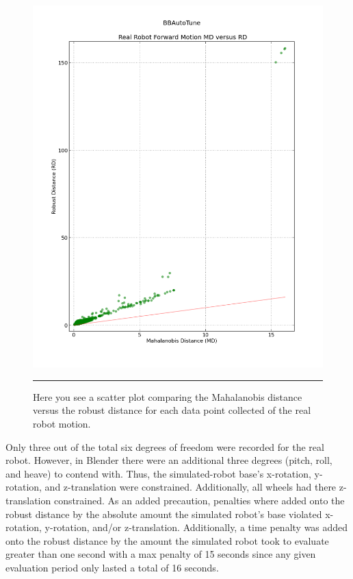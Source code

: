 \begin{figure}[htbp]
\centering
\includegraphics[scale=0.5]{../Figures/Chapter4/real_robot_md_vs_rd.png}
\rule{35em}{0.5pt}
\caption[Real Robot Forward Motion MD versus RD]{Here you see a scatter plot comparing the Mahalanobis distance versus the robust distance for each data point collected of the real robot motion.}
\label{fig:real_robot_md_vs_rd}
\end{figure}

Only three out of the total six degrees of freedom were recorded for the real robot. However, in Blender there were an additional three degrees (pitch, roll, and heave) to contend with.  Thus, the simulated-robot base's x-rotation, y-rotation, and z-translation were constrained. Additionally, all wheels had there z-translation constrained. As an added precaution, penalties where added onto the robust distance by the absolute amount the simulated robot's base violated x-rotation, y-rotation, and/or z-translation. Additionally, a time penalty was added onto the robust distance by the amount the simulated robot took to evaluate greater than one second with a max penalty of 15 seconds since any given evaluation period only lasted a total of 16 seconds.

